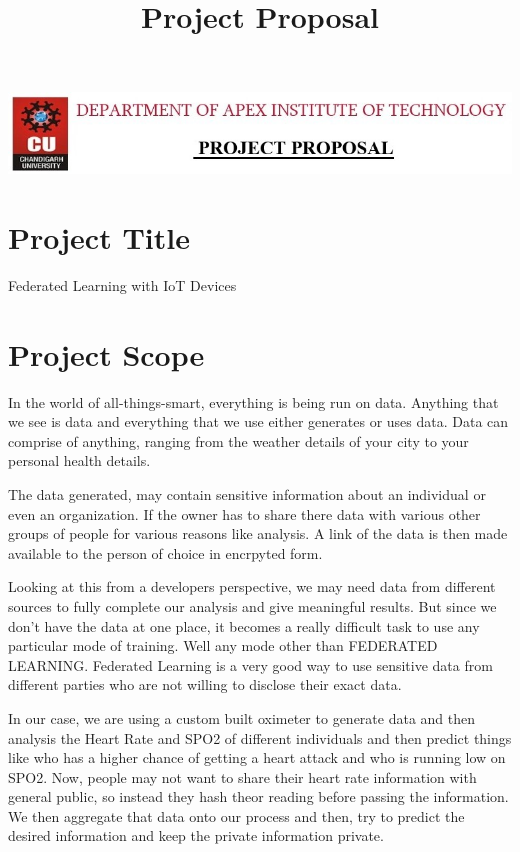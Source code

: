 \documentclass{article}
\title{Project Proposal}
\author{}
\date{}
\begin{document}
\includegraphics[width=\textwidth]{private/Header.jpeg}
\vspace{3em}

\section{Project Title}

\Large{Federated Learning with IoT Devices}

\section{Project Scope}

In the world of all-things-smart, everything is being run on data. Anything that we see is data and everything that we use either generates or uses data. Data can comprise of anything, ranging from the weather details of your city to your personal health details.

The data generated, may contain sensitive information about an individual or even an organization. If the owner has to share there data with various other groups of people for various reasons like analysis. A link of the data is then made available to the person of choice in encrpyted form.

Looking at this from a developers perspective, we may need data from different sources to fully complete our analysis and give meaningful results. But since we don't have the data at one place, it becomes a really difficult task to use any particular mode of training. Well any mode other than FEDERATED LEARNING. Federated Learning is a very good way to use sensitive data from different parties who are not willing to disclose their exact data. 

In our case, we are using a custom built oximeter to generate data and then analysis the Heart Rate and SPO2 of different individuals and then predict things like who has a higher chance of getting a heart attack and who is running low on SPO2. Now, people may not want to share their heart rate information with general public, so instead they hash theor reading before passing the information. We then aggregate that data onto our process and then, try to predict the desired information and keep the private information private.
\end{document}
